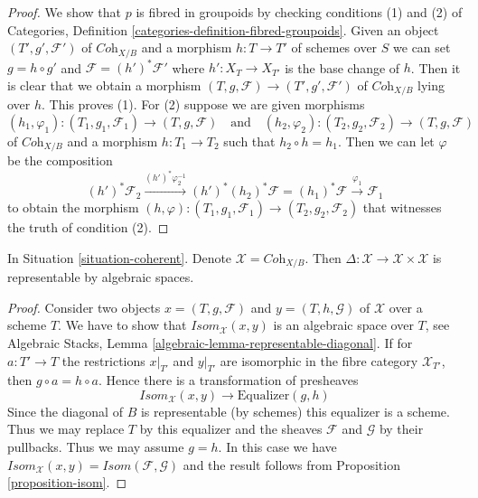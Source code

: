 \begin{proof}
We show that $p$ is fibred in groupoids by checking conditions
(1) and (2) of Categories, Definition
\ref{categories-definition-fibred-groupoids}.
Given an object $(T', g', \mathcal{F}')$
of $\textit{Coh}_{X/B}$ and a morphism $h : T \to T'$ of
schemes over $S$ we can set $g = h \circ g'$ and
$\mathcal{F} = (h')^*\mathcal{F}'$ where $h' : X_T \to X_{T'}$
is the base change of $h$. Then it is clear that we obtain
a morphism $(T, g, \mathcal{F}) \to (T', g', \mathcal{F}')$
of $\textit{Coh}_{X/B}$ lying over $h$. This proves (1).
For (2) suppose we are given morphisms
$$
(h_1, \varphi_1) : (T_1, g_1, \mathcal{F}_1) \to (T, g, \mathcal{F})
\quad\text{and}\quad
(h_2, \varphi_2) : (T_2, g_2, \mathcal{F}_2) \to (T, g, \mathcal{F})
$$
of $\textit{Coh}_{X/B}$ and a morphism $h : T_1 \to T_2$ such that
$h_2 \circ h = h_1$. Then we can let $\varphi$ be the composition
$$
(h')^*\mathcal{F}_2
\xrightarrow{(h')^*\varphi_2^{-1}}
(h')^*(h_2)^*\mathcal{F} = (h_1)^*\mathcal{F}
\xrightarrow{\varphi_1}
\mathcal{F}_1
$$
to obtain the morphism
$(h, \varphi) : (T_1, g_1, \mathcal{F}_1) \to (T_2, g_2, \mathcal{F}_2)$
that witnesses the truth of condition (2).
\end{proof}

\begin{lemma}
\label{lemma-coherent-diagonal}
In Situation \ref{situation-coherent}. Denote
$\mathcal{X} = \textit{Coh}_{X/B}$. Then
$\Delta : \mathcal{X} \to \mathcal{X} \times \mathcal{X}$ is
representable by algebraic spaces.
\end{lemma}

\begin{proof}
Consider two objects $x = (T, g, \mathcal{F})$ and $y = (T, h, \mathcal{G})$
of $\mathcal{X}$ over a scheme $T$. We have to show that
$\mathit{Isom}_\mathcal{X}(x, y)$ is an algebraic space over $T$, see
Algebraic Stacks, Lemma \ref{algebraic-lemma-representable-diagonal}.
If for $a : T' \to T$ the restrictions $x|_{T'}$ and $y|_{T'}$ are isomorphic
in the fibre category $\mathcal{X}_{T'}$, then $g \circ a = h \circ a$.
Hence there is a transformation of presheaves
$$
\mathit{Isom}_\mathcal{X}(x, y) \longrightarrow \text{Equalizer}(g, h)
$$
Since the diagonal of $B$ is representable (by schemes) this equalizer is
a scheme. Thus we may replace $T$ by this equalizer and the sheaves
$\mathcal{F}$ and $\mathcal{G}$ by their pullbacks. Thus we may assume
$g = h$. In this case we have
$\mathit{Isom}_\mathcal{X}(x, y) = \mathit{Isom}(\mathcal{F}, \mathcal{G})$
and the result follows from Proposition \ref{proposition-isom}.
\end{proof}

